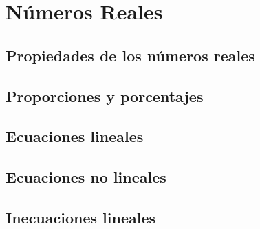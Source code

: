 \chapter{Números Reales}    

\section{Propiedades de los números reales}

\section{Proporciones y porcentajes}

\section{Ecuaciones lineales}

\section{Ecuaciones no lineales}

\section{Inecuaciones lineales}
